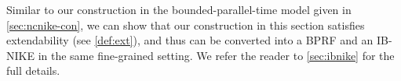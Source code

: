  Similar to our construction in the bounded-parallel-time model given in \cref{sec:ncnike-con}, we can show that our construction in this section satisfies extendability (see \cref{def:ext}), and thus can be converted into a BPRF and an IB-NIKE in the same fine-grained setting. We refer the reader to \cref{sec:ibnike} for the full details.
